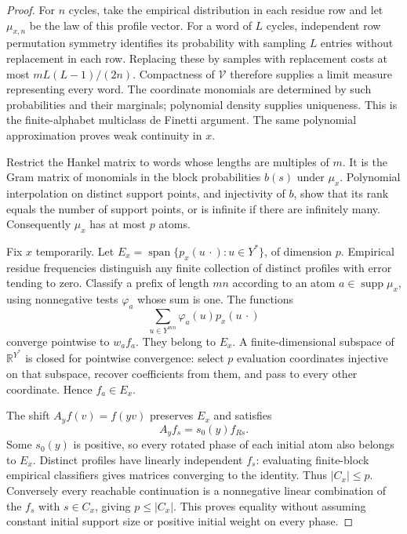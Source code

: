 \documentclass[11pt]{article}
\theoremstyle{remark}\newtheorem{remark}[theorem]{Remark}
\newcommand{\R}{\mathbb R}\newcommand{\one}{\mathbf1}
\newcommand{\supp}{\operatorname{supp}}\newcommand{\St}{\operatorname{St}}
\begin{document}
\begin{proof}
For $n$ cycles, take the empirical distribution in each residue row and let $\mu_{x,n}$ be the law of this profile vector. For a word of $L$ cycles, independent row permutation symmetry identifies its probability with sampling $L$ entries without replacement in each row. Replacing these by samples with replacement costs at most $mL(L-1)/(2n)$. Compactness of $\mathcal V$ therefore supplies a limit measure representing every word. The coordinate monomials are determined by such probabilities and their marginals; polynomial density supplies uniqueness. This is the finite-alphabet multiclass de Finetti argument. The same polynomial approximation proves weak continuity in $x$.

Restrict the Hankel matrix to words whose lengths are multiples of $m$. It is the Gram matrix of monomials in the block probabilities $b(s)$ under $\mu_x$. Polynomial interpolation on distinct support points, and injectivity of $b$, show that its rank equals the number of support points, or is infinite if there are infinitely many. Consequently $\mu_x$ has at most $p$ atoms.

Fix $x$ temporarily. Let $E_x=\operatorname{span}\{p_x(u\,\cdot):u\in Y^*\}$, of dimension $p$. Empirical residue frequencies distinguish any finite collection of distinct profiles with error tending to zero. Classify a prefix of length $mn$ according to an atom $a\in\supp\mu_x$, using nonnegative tests $\varphi_a$ whose sum is one. The functions
\[
\sum_{u\in Y^{mn}}\varphi_a(u)p_x(u\,\cdot)
\]
converge pointwise to $w_a f_a$. They belong to $E_x$. A finite-dimensional subspace of $\R^{Y^*}$ is closed for pointwise convergence: select $p$ evaluation coordinates injective on that subspace, recover coefficients from them, and pass to every other coordinate. Hence $f_a\in E_x$.

The shift $A_yf(v)=f(yv)$ preserves $E_x$ and satisfies
\[
A_yf_s=s_0(y)f_{Rs}.
\]
Some $s_0(y)$ is positive, so every rotated phase of each initial atom also belongs to $E_x$. Distinct profiles have linearly independent $f_s$: evaluating finite-block empirical classifiers gives matrices converging to the identity. Thus $|C_x|\leq p$. Conversely every reachable continuation is a nonnegative linear combination of the $f_s$ with $s\in C_x$, giving $p\leq|C_x|$. This proves equality without assuming constant initial support size or positive initial weight on every phase.


\end{proof}
\end{document}

